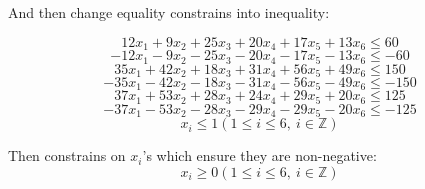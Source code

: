 \documentclass[12pt,a4paper]{article}
\theoremstyle{definition}
\begin{document}
\begin{enumerate}
\begin{enumerate}
            And then change equality constrains into inequality:
            
            \begin{equation*}
            12x_1+9x_2+25x_3+20x_4+17x_5+13x_6 \le 60
            \end{equation*}
            \begin{equation*}
            -12x_1-9x_2-25x_3-20x_4-17x_5-13x_6 \le -60
            \end{equation*}
            \begin{equation*}
            35x_1+42x_2+18x_3+31x_4+56x_5+49x_6 \le 150
            \end{equation*}
            \begin{equation*}
            -35x_1-42x_2-18x_3-31x_4-56x_5-49x_6 \le -150
            \end{equation*}
            \begin{equation*}
            37x_1+53x_2+28x_3+24x_4+29x_5+20x_6 \le 125
            \end{equation*}
            \begin{equation*}
            -37x_1-53x_2-28x_3-29x_4-29x_5-20x_6 \le -125
            \end{equation*}
            \begin{equation*}
                x_i\le 1(1\le i \le 6,\ i\in \mathbb{Z})
            \end{equation*}
            
            Then constrains on $x_i$'s which ensure they are non-negative:
            \begin{equation*}
            x_i\ge 0(1\le i \le 6,\ i\in \mathbb{Z})
            \end{equation*}
            

\end{enumerate}
\end{enumerate}
\end{document}
